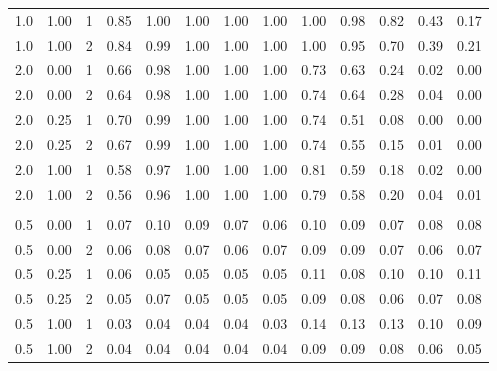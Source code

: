 \begin{table}
\begin{threeparttable}
\begin{tabular}[t]{rrrrrrrrrrrrr}
\hspace{1em}1.0 & 1.00 & 1 & 0.85 & 1.00 & 1.00 & 1.00 & 1.00 & 1.00 & 0.98 & 0.82 & 0.43 & 0.17\\
\hspace{1em}1.0 & 1.00 & 2 & 0.84 & 0.99 & 1.00 & 1.00 & 1.00 & 1.00 & 0.95 & 0.70 & 0.39 & 0.21\\
\hspace{1em}2.0 & 0.00 & 1 & 0.66 & 0.98 & 1.00 & 1.00 & 1.00 & 0.73 & 0.63 & 0.24 & 0.02 & 0.00\\
\hspace{1em}2.0 & 0.00 & 2 & 0.64 & 0.98 & 1.00 & 1.00 & 1.00 & 0.74 & 0.64 & 0.28 & 0.04 & 0.00\\
\hspace{1em}2.0 & 0.25 & 1 & 0.70 & 0.99 & 1.00 & 1.00 & 1.00 & 0.74 & 0.51 & 0.08 & 0.00 & 0.00\\
\hspace{1em}2.0 & 0.25 & 2 & 0.67 & 0.99 & 1.00 & 1.00 & 1.00 & 0.74 & 0.55 & 0.15 & 0.01 & 0.00\\
\hspace{1em}2.0 & 1.00 & 1 & 0.58 & 0.97 & 1.00 & 1.00 & 1.00 & 0.81 & 0.59 & 0.18 & 0.02 & 0.00\\
\hspace{1em}2.0 & 1.00 & 2 & 0.56 & 0.96 & 1.00 & 1.00 & 1.00 & 0.79 & 0.58 & 0.20 & 0.04 & 0.01\\
\addlinespace[0.3em]
\multicolumn{13}{c}{\textbf{Type I}}\\
\hspace{1em}0.5 & 0.00 & 1 & 0.07 & 0.10 & 0.09 & 0.07 & 0.06 & 0.10 & 0.09 & 0.07 & 0.08 & 0.08\\
\hspace{1em}0.5 & 0.00 & 2 & 0.06 & 0.08 & 0.07 & 0.06 & 0.07 & 0.09 & 0.09 & 0.07 & 0.06 & 0.07\\
\hspace{1em}0.5 & 0.25 & 1 & 0.06 & 0.05 & 0.05 & 0.05 & 0.05 & 0.11 & 0.08 & 0.10 & 0.10 & 0.11\\
\hspace{1em}0.5 & 0.25 & 2 & 0.05 & 0.07 & 0.05 & 0.05 & 0.05 & 0.09 & 0.08 & 0.06 & 0.07 & 0.08\\
\hspace{1em}0.5 & 1.00 & 1 & 0.03 & 0.04 & 0.04 & 0.04 & 0.03 & 0.14 & 0.13 & 0.13 & 0.10 & 0.09\\
\hspace{1em}0.5 & 1.00 & 2 & 0.04 & 0.04 & 0.04 & 0.04 & 0.04 & 0.09 & 0.09 & 0.08 & 0.06 & 0.05\\

\end{tabular}
\end{threeparttable}
\end{table}
